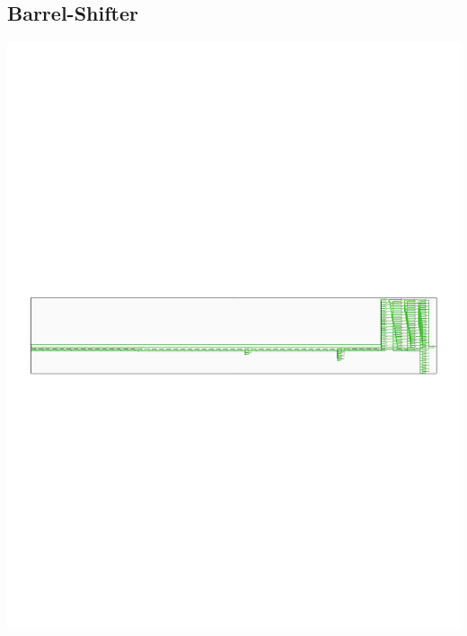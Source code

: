 \documentclass[8pt,executivepaper]{article}
\begin{document}
\subsection{Barrel-Shifter}
\begin{center}
  \includegraphics[scale=0.5]{sources/schematicBarrel.pdf}
\end{center}
\end{document}
